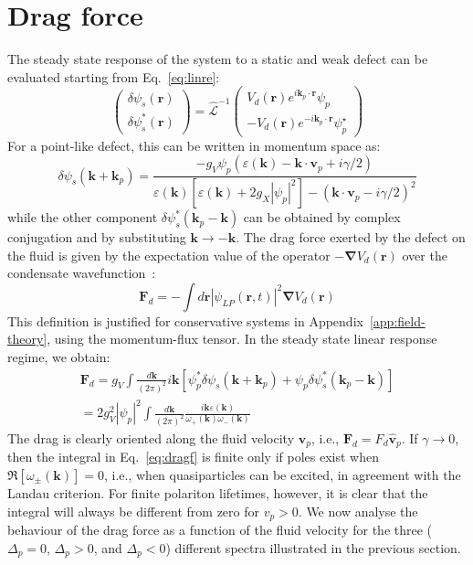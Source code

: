 \section{Drag force}
\label{sec:drag}
%
The steady state response of the system to a static and weak defect
can be evaluated starting from Eq.~\eqref{eq:linre}:
%
\begin{equation*}
  \begin{pmatrix} \delta \psi_s(\bm{r}) \\ \delta
    \psi_s^*(\bm{r}) \end{pmatrix} =
  \hat{\mathcal{L}}^{-1} \begin{pmatrix} V_d(\bm{r}) e^{i \bm{k}_p
      \cdot \bm{r}} \psi_p \\ -V_d(\bm{r}) e^{-i \bm{k}_p \cdot
      \bm{r}} \psi_p^{\star} \end{pmatrix}
\end{equation*}
%
For a point-like defect, this can be written in momentum space as:
%
\begin{equation*}
  \delta \psi_s (\bm{k} + \bm{k}_p) = \frac{-g_V \psi_p
    (\varepsilon(\bm{k}) - \bm{k} \cdot \bm{v}_p +
    i\gamma/2)}{\varepsilon(\bm{k}) [\varepsilon(\bm{k}) +
      2g_X|\psi_p|^2] - (\bm{k} \cdot \bm{v}_p - i\gamma/2)^2}
\end{equation*}
%
while the other component $\delta \psi_s^* (\bm{k}_p - \bm{k})$ can be
obtained by complex conjugation and by substituting
$\bm{k} \rightarrow -\bm{k}$. The drag force exerted by the defect on the
fluid is given by the expectation value of the operator
$-\bm{\nabla}V_d(\bm{r})$ over the condensate
wavefunction~\cite{Pavloff2002}:
%
\begin{equation}
  \bm{F}_d = - \int d\bm{r} |\psi_{LP}(\bm{r},t)|^2 \bm{\nabla}V_d(\bm{r})
\end{equation}
%
This definition is justified for conservative systems in
Appendix~\ref{app:field-theory}, using the momentum-flux tensor. In
the steady state linear response regime, we obtain:
%
\begin{multline}
  \bm{F}_d = g_V \int \frac{d\bm{k}}{(2\pi)^2} i\bm{k}
  \left[\psi_p^* \delta\psi_s (\bm{k} + \bm{k}_p) + \psi_p \delta
    \psi_s^* (\bm{k}_p - \bm{k})\right]\\
%
  = 2g_V^2|\psi_p|^2 \int \frac{d\bm{k}}{(2\pi)^2} \frac{i\bm{k}
    \varepsilon(\bm{k})}{\omega_{+} (\bm{k})\omega_{-} (\bm{k})}
    \label{eq:dragf}
\end{multline}
%
The drag is clearly oriented along the fluid velocity $\bm{v}_p$,
i.e., $\bm{F}_d = F_d \hat{\bm{v}}_p$. If $\gamma \to 0$, then the
integral in Eq.~\eqref{eq:dragf} is finite only if poles exist when
$\Re [\omega_{\pm} (\bm{k})] = 0$, i.e., when quasiparticles can be
excited, in agreement with the Landau criterion. For finite polariton
lifetimes, however, it is clear that the integral will always be
different from zero for $v_p>0$.
We now analyse the behaviour of the drag force as a function of the
fluid velocity for the three ($\Delta_p = 0$, $\Delta_p > 0$, and
$\Delta_p < 0$) different spectra illustrated in the previous section.

